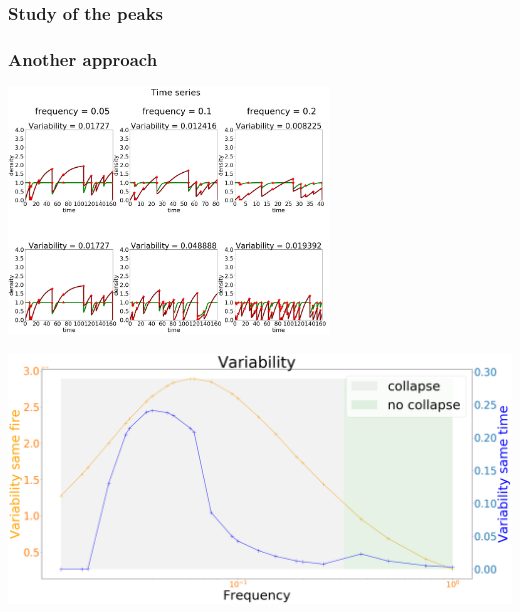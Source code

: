 \documentclass{beamer}
\begin{document}
\begin{frame}
\frametitle{Study of the peaks}
\end{frame}


\begin{frame}
\frametitle{Another approach}
\includegraphics[width=8.5cm]{same_time_series_3.png}
\end{frame}


\begin{frame}
\includegraphics[width=10.cm]{var_same/5.png}
\end{frame}
\end{document}
